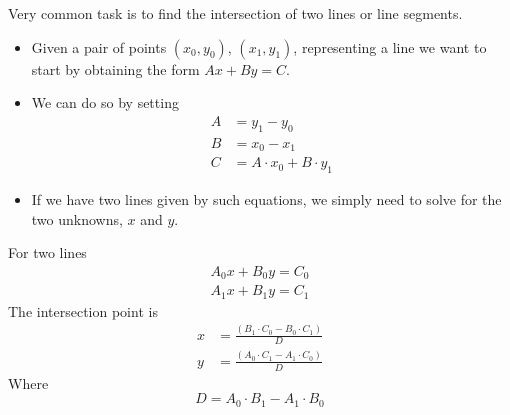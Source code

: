 \documentclass{beamer}
\begin{document}
\begin{frame}[plain]
  Very common task is to find the intersection of two lines or line segments.
  \begin{itemize}
    \item Given a pair of points $(x_0, y_0)$, $(x_1, y_1)$, representing a
      line we want to start by obtaining the form $Ax + By = C$.
    \item We can do so by setting
      \begin{align*}
        A &= y_1 - y_0 \\
        B &= x_0 - x_1 \\
        C &= A\cdot x_0 + B\cdot y_1
      \end{align*}
    \vspace{-10pt}
    \item If we have two lines given by such equations, we simply need to solve
      for the two unknowns, $x$ and $y$.
  \end{itemize}
\end{frame}

\begin{frame}[plain]
  For two lines
  \begin{align*}
    A_0 x + B_0 y = C_0  \\
    A_1 x + B_1 y = C_1
  \end{align*}
  The intersection point is
  \begin{align*}
      x &= \frac{(B_1 \cdot C_0 - B_0 \cdot C_1)}{D} \\
      y &= \frac{(A_0 \cdot C_1 - A_1 \cdot C_0)}{D}
  \end{align*}
  Where
  \[
    D = A_0 \cdot B_1 - A_1 \cdot B_0
  \]
\end{frame}
\end{document}
